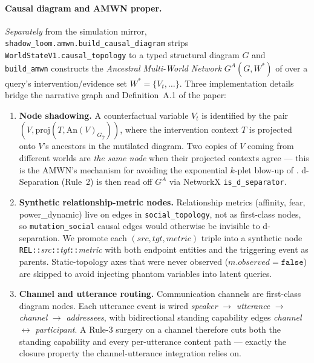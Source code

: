 \documentclass[11pt]{article}
\begin{document}
\paragraph{Causal diagram and AMWN proper.}
\textsl{Separately} from the simulation mirror,
\texttt{shadow\_loom.amwn.build\_causal\_diagram} strips
\texttt{WorldStateV1.causal\_topology} to a typed structural
diagram $G$ and \texttt{build\_amwn} constructs the
\textsl{Ancestral Multi-World Network} $G^A(G, W^*)$ of
\citet{correa2025amwn} over a query's intervention/evidence set
$W^* = \{V_t, \ldots\}$. Three implementation details bridge the
narrative graph and Definition~A.1 of the paper:
\begin{enumerate}
  \item \textbf{Node shadowing.} A counterfactual variable
        $V_t$ is identified by the pair
        $(V, \text{proj}(T, \text{An}(V)_{G_{\bar T}}))$, where
        the intervention context $T$ is projected onto $V$'s
        ancestors in the mutilated diagram. Two copies of $V$
        coming from different worlds are \emph{the same node}
        when their projected contexts agree --- this is the
        AMWN's mechanism for avoiding the exponential
        $k$-plet blow-up of \citet{shpitser2007counterfactuals}.
        d-Separation (Rule~2) is then read off $G^A$ via
        NetworkX \texttt{is\_d\_separator}.
  \item \textbf{Synthetic relationship-metric nodes.}
        Relationship metrics (affinity, fear, power\_dynamic)
        live on edges in
        \texttt{social\_topology}, not as first-class nodes, so
        \texttt{mutation\_social} causal edges would otherwise be
        invisible to d-separation. We promote each
        $(\textit{src}, \textit{tgt}, \textit{metric})$ triple
        into a synthetic node
        \texttt{REL::}\textit{src}\texttt{::}\textit{tgt}\texttt{::}\textit{metric}
        with both endpoint entities and the triggering event as
        parents. Static-topology axes that were never observed
        ($m.\textit{observed} = \texttt{false}$) are skipped to
        avoid injecting phantom variables into latent queries.
  \item \textbf{Channel and utterance routing.} Communication
        channels are first-class diagram nodes. Each
        utterance event is wired
        \emph{speaker} $\to$ \emph{utterance} $\to$ \emph{channel}
        $\to$ \emph{addressees}, with bidirectional standing
        capability edges \emph{channel} $\leftrightarrow$
        \emph{participant}. A Rule-3 surgery on a channel
        therefore cuts both the standing capability and every
        per-utterance content path --- exactly the closure
        property the channel-utterance integration relies on.
\end{enumerate}
\end{document}

